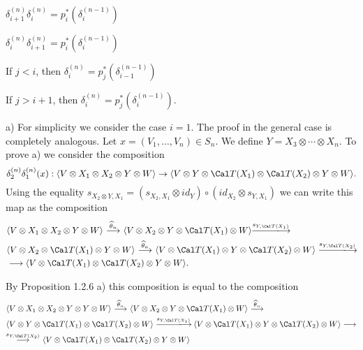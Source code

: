   $\delta_{i+1}^{(n)} \delta_{i}^{(n)} =
p^*_i(\delta_{i}^{(n-1)})$

  $\delta_i^{(n)} \delta_{i+1}^{(n)} = p^*_i(\delta_i^{(n-1)})$

  If $j < i$, then  $\delta_{i}^{(n)} =
p^*_j(\delta_{i-1}^{(n-1)})$

  If $j > i+1$, then $\delta_{i}^{(n)} =
p^*_j(\delta_{i}^{(n-1)})$.
\endproclaim

  a)  For simplicity we consider the case  $i = 1$.  The proof in
the
general case is completely analogous.  Let  $x = (V_1,\ldots,V_n) \in S_n$.  We
define  $Y = X_3 \otimes \cdots \otimes X_n$.  To prove a) we consider the
composition
$$
\delta_2^{(n)}\delta_1^{(n)}(x):  \langle V \otimes X_1 \otimes X_2
\otimes Y \otimes W\rangle \to \langle V \otimes Y \otimes {\Cal T}(X_1)
\otimes {\Cal T}(X_2) \otimes Y \otimes W\rangle.
$$
Using the equality  $s_{X_2 \otimes Y,X_1} = (s_{X_2,X_1} \otimes id_Y)
\circ (id_{X_2} \otimes s_{Y,X_1})$   we can write this map as the
composition
$$
\aligned
& \langle V \otimes X_1 \otimes X_2 \otimes Y \otimes W\rangle\
{\buildrel {\widehat{\theta}_n}\over\longrightarrow}\ \langle V \otimes X_2
\otimes Y \otimes {\Cal T}(X_1) \otimes W\rangle
{\buildrel {s_{Y,{\Cal T}(X_1)}}\over\llongrightarrow}\\
& \langle V \otimes X_2 \otimes {\Cal T}(X_1) \otimes Y \otimes W\rangle\
{\buildrel {\widehat{\theta}_n}\over\longrightarrow}\ \langle V
\otimes {\Cal T}(X_1) \otimes Y \otimes {\Cal T}(X_2) \otimes W\rangle\
{\buildrel {s_{Y, {\Cal T}(X_2)}}\over\llongrightarrow}\\
& \longrightarrow \langle V \otimes {\Cal T}(X_1) \otimes {\Cal T}(X_2)
\otimes Y \otimes W\rangle.
\endaligned
$$
\enddemo

By  Proposition 1.2.6 a)  this composition is equal to the composition
$$
\aligned
& \langle V \otimes X_1 \otimes X_2 \otimes Y \otimes Y \otimes W\rangle\
{\buildrel{\widehat{\theta}_n}\over\longrightarrow}\
\langle V \otimes X_2 \otimes Y \otimes {\Cal T}(X_1) \otimes W\rangle\
{\buildrel{\widehat{\theta}_n}\over\longrightarrow} \\
& \langle V \otimes Y \otimes {\Cal T}(X_1) \otimes {\Cal T}(X_2) \otimes
W\rangle\
{\buildrel{s_{Y,{\Cal T}(X_1)}}\over\llongrightarrow}\
\langle V \otimes {\Cal T}(X_1) \otimes Y \otimes {\Cal T}(X_2) \otimes
W\rangle \longrightarrow \\
& {\buildrel {s_{Y,{\Cal T}(X_2)}}\over\longrightarrow}\ \langle V \otimes
{\Cal T}(X_1) \otimes {\Cal T}(X_2) \otimes Y \otimes W\rangle\
\endaligned
$$

